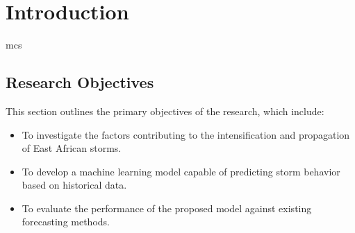 \chapter{Introduction}
\label{ch:intro}

\cite{Gebrechorkos2019}
\acrfull{mcs}

\section{Research Objectives}

This section outlines the primary objectives of the research, which include:
\begin{itemize}
    \item To investigate the factors contributing to the intensification and propagation of East African storms.
    \item To develop a machine learning model capable of predicting storm behavior based on historical data.
    \item To evaluate the performance of the proposed model against existing forecasting methods.
\end{itemize}




